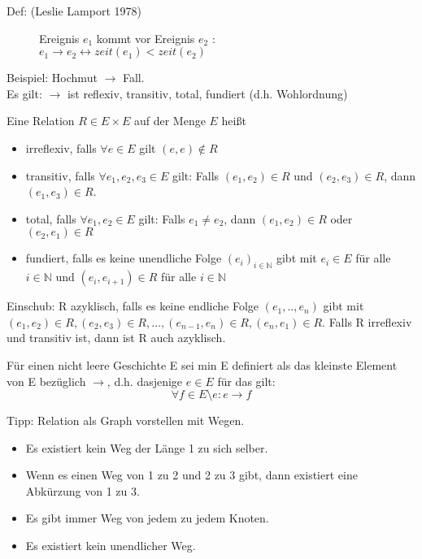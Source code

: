 \begin{description}
	\item[Def: (Leslie Lamport 1978)] Ereignis $e_1$ kommt vor Ereignis $e_2$ :\\
	$e_1 \rightarrow e_2 \leftrightarrow  zeit(e_1) < zeit(e_2)$
\end{description}

Beispiel: Hochmut  $\rightarrow$ Fall.\\
Es gilt:  $\rightarrow$ ist reflexiv, transitiv, total, fundiert (d.h. Wohlordnung)

Eine Relation $R \in E \times E$ auf der Menge $E$ heißt
\begin{itemize}
	\item irreflexiv, falls $\forall e \in E $ gilt $ (e, e) \notin R$
	\item transitiv, falls $\forall e_1, e_2, e_3 \in E $ gilt: Falls $(e_1,e_2) \in R $ und $ (e_2,e_3) \in R$, dann $(e_1,e_3) \in R$.
	\item total, falls $\forall e_1,e_2 \in E$ gilt: Falls $e_1 \neq e_2$, dann $(e_1, e_2) \in R$ oder $(e_2, e_1) \in R$
	\item fundiert, falls es keine unendliche Folge $(e_i)_{i \in \mathbb{N}}$ gibt mit $e_i \in E$ für alle $i \in \mathbb{N}$ und $(e_i, e_{i+1}) \in R$ für alle $i \in \mathbb{N}$
\end{itemize}

Einschub: R azyklisch, falls es keine endliche Folge $(e_1,..,e_n)$ gibt mit $(e_1,e_2) \in R, (e_2,e_3) \in R,...,(e_{n-1},e_n) \in R, (e_n,e_1) \in R$.
Falls R irreflexiv und transitiv ist, dann ist R auch azyklisch.

Für einen nicht leere Geschichte E sei min E definiert als das kleinste Element von E bezüglich $\rightarrow$, d.h. dasjenige $e \in E$ für das gilt:
\begin{equation*}
	\forall f \in E\setminus{e}: e \rightarrow f
\end{equation*}

Tipp: Relation als Graph vorstellen mit Wegen.
\begin{itemize}
	\item Es existiert kein Weg der Länge 1 zu sich selber.
	\item Wenn es einen Weg von 1 zu 2 und 2 zu 3 gibt, dann existiert eine Abkürzung von 1 zu 3.
	\item Es gibt immer Weg von jedem zu jedem Knoten.
	\item Es existiert kein unendlicher Weg.
\end{itemize}

